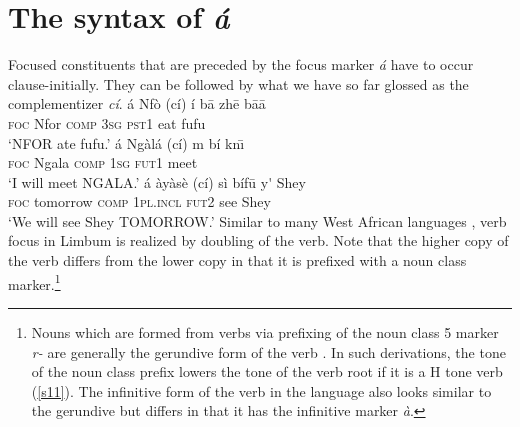 \documentclass[output=paper,
modfonts
]{langscibook}
\begin{document}
\ea  \label{uni2}
\settowidth{}
\z \z 


\section{The syntax of \textit{\'a}}\label{sec:syntax}
Focused constituents that are preceded by the focus marker {\em \'a} have to occur clause-initially. They can be followed by what we have so far glossed as the complementizer {\em c\'i}.
\ea
\settowidth{}
\ea \label{s7}
\gll \'{a} {Nf\`{o}} (c\'{i}) \'{i} b\=a zh\=e b\=a\=a\\  
     \textsc{foc} {Nfor} \textsc{comp} \textsc{3sg} \textsc{pst1} eat fufu\\ 
\glt `NFOR ate fufu.'
\ex \label{s8}
\gll \'{a} {Ng\`{a}l\'{a}} (c\'{i}) m b\'{i} kn\={\i}\\  
     \textsc{foc} {Ngala} \textsc{comp} \textsc{1sg} \textsc{fut1} meet\\ 
\glt `I will meet NGALA.'
\ex \label{s9}
\gll \'a {\`ay\`as\`e} (c\'i) s\`i b\'if\=u y{\'{\textepsilon}} Shey\\  
     \textsc{foc} {tomorrow} \textsc{comp} \textsc{1pl.incl}  \textsc{fut2} see Shey\\ 
\glt `We will see Shey TOMORROW.'
\z \z
Similar to many West African languages \citep{Koopman1984,Ameka1992,Manfredi1997,Biloa1997,Aboh1998,Aboh2006}, verb focus in Limbum is realized by doubling of the verb. Note that the higher copy of the verb differs from the lower copy in that it is prefixed with a noun class marker.\footnote{Nouns which are formed from verbs via prefixing of the noun class 5 marker \textit{r-} are generally the gerundive form of the verb \citep{Nformi2017}. In such derivations, the tone of the noun class prefix lowers the tone of the verb root if it is a H tone verb (\ref{s11}). The infinitive form of the verb in the language also looks similar to the gerundive but differs in that it has the infinitive marker \textit{\`a}.}
\end{document}
